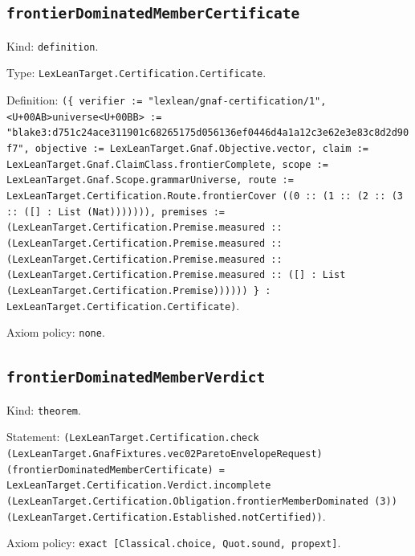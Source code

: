 \documentclass[11pt]{article}
\begin{document}
\subsection*{\texttt{frontierDominatedMemberCertificate}}
\noindent Kind: \texttt{definition}.\par
\noindent Type: \texttt{LexLeanTarget.Certification.Certificate}.\par
\noindent Definition: \texttt{(\{ verifier := "lexlean/gnaf-certification/1", <U+00AB>universe<U+00BB> := "blake3:d751c24ace311901c68265175d056136ef0446d4a1a12c3e62e3e83c8d2d90f7", objective := LexLeanTarget.Gnaf.Objective.vector, claim := LexLeanTarget.Gnaf.ClaimClass.frontierComplete, scope := LexLeanTarget.Gnaf.Scope.grammarUniverse, route := LexLeanTarget.Certification.Route.frontierCover ((0 :: (1 :: (2 :: (3 :: ([] : List (Nat))))))), premises := (LexLeanTarget.Certification.Premise.measured :: (LexLeanTarget.Certification.Premise.measured :: (LexLeanTarget.Certification.Premise.measured :: (LexLeanTarget.Certification.Premise.measured :: ([] : List (LexLeanTarget.Certification.Premise)))))) \} : LexLeanTarget.Certification.Certificate)}.\par
\noindent Axiom policy: \texttt{none}.\par
\subsection*{\texttt{frontierDominatedMemberVerdict}}
\noindent Kind: \texttt{theorem}.\par
\noindent Statement: \texttt{(LexLeanTarget.Certification.check (LexLeanTarget.GnafFixtures.vec02ParetoEnvelopeRequest) (frontierDominatedMemberCertificate) = LexLeanTarget.Certification.Verdict.incomplete (LexLeanTarget.Certification.Obligation.frontierMemberDominated (3)) (LexLeanTarget.Certification.Established.notCertified))}.\par
\noindent Axiom policy: \texttt{exact [Classical.choice, Quot.sound, propext]}.\par
\end{document}

